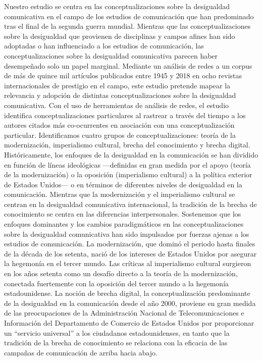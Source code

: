 \documentclass{tufte-handout}
\begin{document}
Nuestro estudio se centra en las conceptualizaciones sobre la
desigualdad comunicativa en el campo de los estudios de comunicación que
han predominado tras el final de la segunda guerra mundial. Mientras que
las conceptualizaciones sobre la desigualdad que provienen de
disciplinas y campos afines han sido adoptadas o han influenciado a los
estudios de comunicación, las conceptualizaciones sobre la desigualdad
comunicativa parecen haber desempeñado solo un papel marginal. Mediante
un análisis de redes a un corpus de más de quince mil artículos
publicados entre 1945 y 2018 en ocho revistas internacionales de
prestigio en el campo, este estudio pretende mapear la relevancia y
adopción de distintas conceptualizaciones sobre la desigualdad
comunicativa. Con el uso de herramientas de análisis de redes, el
estudio identifica conceptualizaciones particulares al rastrear a través
del tiempo a los autores citados más co-ocurrentes en asociación con una
conceptualización particular. Identificamos cuatro grupos de
conceptualizaciones: teoría de la modernización, imperialismo cultural,
brecha del conocimiento y brecha digital. Históricamente, los enfoques
de la desigualdad en la comunicación se han dividido en función de
líneas ideológicas ---definidas en gran medida por el apoyo (teoría de
la modernización) o la oposición (imperialismo cultural) a la política
exterior de Estados Unidos--- o en términos de diferentes niveles de
desigualdad en la comunicación. Mientras que la modernización y el
imperialismo cultural se centran en la desigualdad comunicativa
internacional, la tradición de la brecha de conocimiento se centra en
las diferencias interpersonales. Sostenemos que los enfoques dominantes
y los cambios paradigmáticos en las conceptualizaciones sobre la
desigualdad comunicativa han sido impulsados por fuerzas ajenas a los
estudios de comunicación. La modernización, que dominó el periodo hasta
finales de la década de los setenta, nació de los intereses de Estados
Unidos por asegurar la hegemonía en el tercer mundo. Las críticas al
imperialismo cultural surgieron en los años setenta como un desafío
directo a la teoría de la modernización, conectada fuertemente con la
oposición del tercer mundo a la hegemonía estadounidense. La noción de
brecha digital, la conceptualización predominante de la desigualdad en
la comunicación desde el año 2000, proviene en gran medida de las
preocupaciones de la Administración Nacional de Telecomunicaciones e
Información del Departamento de Comercio de Estados Unidos por
proporcionar un ``servicio universal'' a los ciudadanos estadounidenses,
en tanto que la tradición de la brecha de conocimiento se relaciona con
la eficacia de las campañas de comunicación de arriba hacia abajo.
\end{document}
